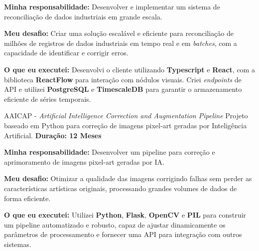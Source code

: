     \resumeItemListStart  
      \item \textbf{Minha responsabilidade:} Desenvolver e implementar um sistema de reconciliação de dados industriais em grande escala.  
      \item \textbf{Meu desafio:} Criar uma solução escalável e eficiente para reconciliação de milhões de registros de dados industriais em tempo real e em \textit{batches}, com a capacidade de identificar e corrigir erros.  
      \item \textbf{O que eu executei:} Desenvolvi o cliente utilizando \textbf{Typescript} e \textbf{React}, com a biblioteca \textbf{ReactFlow} para interação com nódulos visuais. Criei \textit{endpoints} de API e utilizei \textbf{PostgreSQL} e \textbf{TimescaleDB} para garantir o armazenamento eficiente de séries temporais.  
    \resumeItemListEnd  

    \resumeProject
      { AAICAP - \textit{Artificial Intelligence Correction and Augmentation Pipeline}}
      {Projeto baseado em Python para correção de imagens pixel-art geradas por Inteligência Artificial.}
      {\textbf{Duração: 12 Meses}}

    \resumeItemListStart  
      \item \textbf{Minha responsabilidade:} Desenvolver um pipeline para correção e aprimoramento de imagens pixel-art geradas por IA.  
      \item \textbf{Meu desafio:} Otimizar a qualidade das imagens corrigindo falhas sem perder as características artísticas originais, processando grandes volumes de dados de forma eficiente.  
      \item \textbf{O que eu executei:} Utilizei \textbf{Python}, \textbf{Flask}, \textbf{OpenCV} e \textbf{PIL} para construir um pipeline automatizado e robusto, capaz de ajustar dinamicamente os parâmetros de processamento e fornecer uma API para integração com outros sistemas.  
    \resumeItemListEnd  
    
\resumeSubHeadingListEnd
\vspace{-8.5mm}

